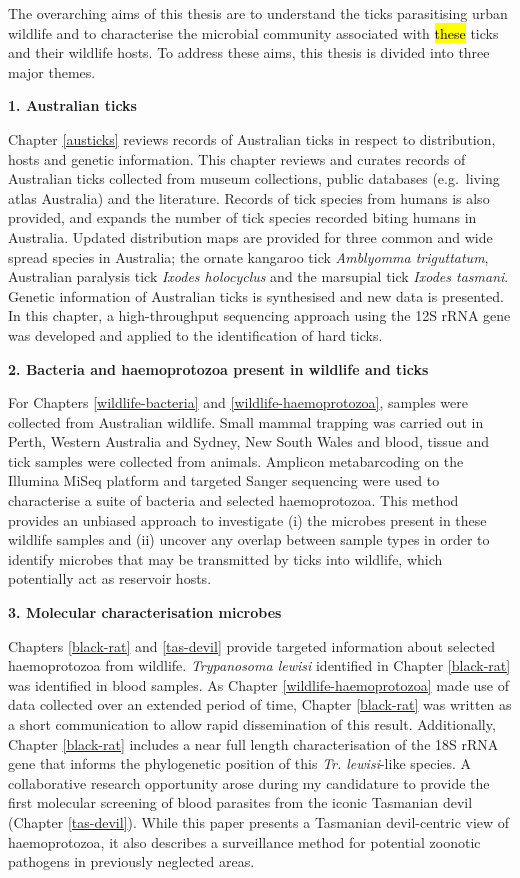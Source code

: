 \documentclass[a4paper, nobind]{templates/ociamthesis}
\begin{document}
The overarching aims of this thesis are to understand the ticks parasitising urban wildlife and to characterise the microbial community associated with \hl{these} ticks and their wildlife hosts. To address these aims, this thesis is divided into three major themes.

\textbf{1. Australian ticks}

Chapter \ref{austicks} reviews records of Australian ticks in respect to distribution, hosts and genetic information.
This chapter reviews and curates records of Australian ticks collected from museum collections, public databases (e.g.~living atlas Australia) and the literature.
Records of tick species from humans is also provided, and expands the number of tick species recorded biting humans in Australia.
Updated distribution maps are provided for three common and wide spread species in Australia; the ornate kangaroo tick \emph{Amblyomma triguttatum}, Australian paralysis tick \emph{Ixodes holocyclus} and the marsupial tick \emph{Ixodes tasmani}.
Genetic information of Australian ticks is synthesised and new data is presented.
In this chapter, a high-throughput sequencing approach using the 12S rRNA gene was developed and applied to the identification of hard ticks.

\textbf{2. Bacteria and haemoprotozoa present in wildlife and ticks}

For Chapters \ref{wildlife-bacteria} and \ref{wildlife-haemoprotozoa}, samples were collected from Australian wildlife.
Small mammal trapping was carried out in Perth, Western Australia and Sydney, New South Wales and blood, tissue and tick samples were collected from animals.
Amplicon metabarcoding on the Illumina MiSeq platform and targeted Sanger sequencing were used to characterise a suite of bacteria and selected haemoprotozoa.
This method provides an unbiased approach to investigate (i) the microbes present in these wildlife samples and (ii) uncover any overlap between sample types in order to identify microbes that may be transmitted by ticks into wildlife, which potentially act as reservoir hosts.

\textbf{3. Molecular characterisation microbes}

Chapters \ref{black-rat} and \ref{tas-devil} provide targeted information about selected haemoprotozoa from wildlife.
\emph{Trypanosoma lewisi} identified in Chapter \ref{black-rat} was identified in blood samples.
As Chapter \ref{wildlife-haemoprotozoa} made use of data collected over an extended period of time, Chapter \ref{black-rat} was written as a short communication to allow rapid dissemination of this result.
Additionally, Chapter \ref{black-rat} includes a near full length characterisation of the 18S rRNA gene that informs the phylogenetic position of this \emph{Tr. lewisi}-like species.
A collaborative research opportunity arose during my candidature to provide the first molecular screening of blood parasites from the iconic Tasmanian devil (Chapter \ref{tas-devil}).
While this paper presents a Tasmanian devil-centric view of haemoprotozoa, it also describes a surveillance method for potential zoonotic pathogens in previously neglected areas.
\end{document}
